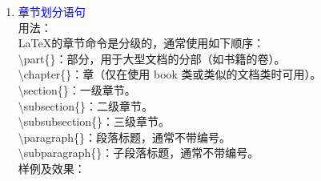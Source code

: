 \documentclass[12pt,a4paper,UTF8]{article}
\begin{document}
\begin{enumerate}
        \item \textcolor{blue}{章节划分语句}\\
        用法：\\
        LaTeX的章节命令是分级的，通常使用如下顺序：\\
        \textbackslash part\{\}：部分，用于大型文档的分部（如书籍的卷）。\\
        \textbackslash chapter\{\}：章（仅在使用 book 类或类似的文档类时可用）。\\
        \textbackslash section\{\}：一级章节。\\
        \textbackslash subsection\{\}：二级章节。\\
        \textbackslash subsubsection\{\}：三级章节。\\
        \textbackslash paragraph\{\}：段落标题，通常不带编号。\\
        \textbackslash subparagraph\{\}：子段落标题，通常不带编号。\\[8pt]
        样例及效果：\\

\end{enumerate}
\end{document}
